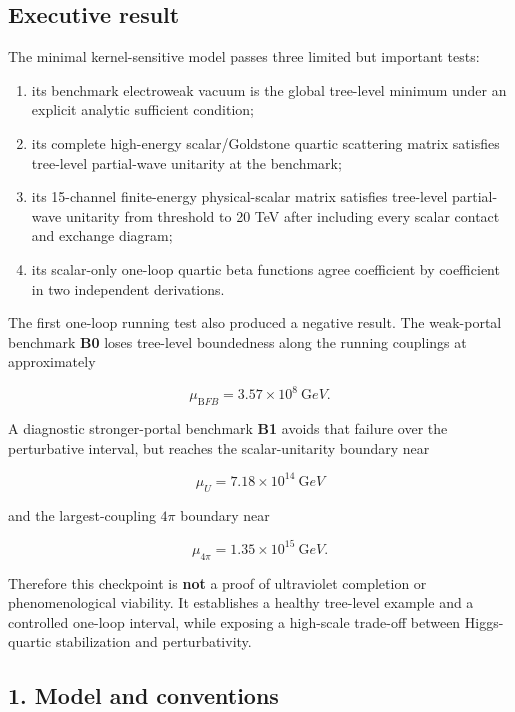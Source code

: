 \documentclass[
]{article}
\providecommand{\tightlist}{%
  \setlength{\itemsep}{0pt}\setlength{\parskip}{0pt}}
\begin{document}
\hypertarget{executive-result}{%
\subsection{Executive result}\label{executive-result}}

The minimal kernel-sensitive model passes three limited but important
tests:

\begin{enumerate}
\def\labelenumi{\arabic{enumi}.}
\tightlist
\item
  its benchmark electroweak vacuum is the global tree-level minimum
  under an explicit analytic sufficient condition;
\item
  its complete high-energy scalar/Goldstone quartic scattering matrix
  satisfies tree-level partial-wave unitarity at the benchmark;
\item
  its 15-channel finite-energy physical-scalar matrix satisfies
  tree-level partial-wave unitarity from threshold to 20 TeV after
  including every scalar contact and exchange diagram;
\item
  its scalar-only one-loop quartic beta functions agree coefficient by
  coefficient in two independent derivations.
\end{enumerate}

The first one-loop running test also produced a negative result. The
weak-portal benchmark \textbf{B0} loses tree-level boundedness along the
running couplings at approximately

\[
\mu_{\mathrm BFB}=3.57\times10^8\ {\mathrm GeV}.
\]

A diagnostic stronger-portal benchmark \textbf{B1} avoids that failure
over the perturbative interval, but reaches the scalar-unitarity
boundary near

\[
\mu_U=7.18\times10^{14}\ {\mathrm GeV}
\]

and the largest-coupling \(4\pi\) boundary near

\[
\mu_{4\pi}=1.35\times10^{15}\ {\mathrm GeV}.
\]

Therefore this checkpoint is \textbf{not} a proof of ultraviolet
completion or phenomenological viability. It establishes a healthy
tree-level example and a controlled one-loop interval, while exposing a
high-scale trade-off between Higgs-quartic stabilization and
perturbativity.

\hypertarget{model-and-conventions}{%
\subsection{1. Model and conventions}\label{model-and-conventions}}
\end{document}

